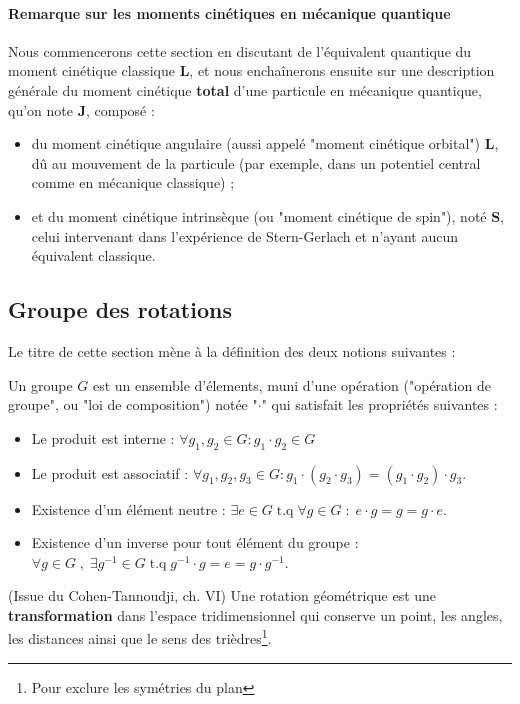 \documentclass[../notesdecours.tex]{subfiles}
\begin{document}
\paragraph{Remarque sur les moments cinétiques en mécanique quantique}
Nous commencerons cette section en discutant de l'équivalent quantique du moment cinétique classique $\mathcal{\mathbf{L}}$, et nous enchaînerons ensuite sur une description générale du moment cinétique \textbf{total} d'une particule en mécanique quantique, qu'on note $\mathbf{J}$, composé :
\begin{itemize}
    \item du moment cinétique angulaire (aussi appelé "moment cinétique orbital") $\mathbf{L}$, dû au mouvement de la particule (par exemple, dans un potentiel central comme en mécanique classique) ;
    \item et du moment cinétique intrinsèque (ou "moment cinétique de spin"), noté $\mathbf{S}$, celui intervenant dans l'expérience de Stern-Gerlach et n'ayant aucun équivalent classique.
\end{itemize}


\subsection{Groupe des rotations}

Le titre de cette section mène à la définition des deux notions suivantes :
\begin{definition}
    Un groupe $G$ est un ensemble d'élements, muni d'une opération ("opération de groupe", ou "loi de composition") notée "$\cdot$" qui satisfait les propriétés suivantes :
    \begin{itemize}
        \item Le produit est interne : $\forall g_1, g_2 \in G : g_1\cdot g_2 \in G$
        \item Le produit est associatif : $\forall g_1, g_2, g_3 \in G : g_1\cdot(g_2\cdot g_3) = (g_1\cdot g_2)\cdot g_3.$
        \item Existence d'un élément neutre : $\exists e\in G \; \text{t.q} \; \forall g \in G \; : \; e\cdot g = g = g\cdot e$.
        \item Existence d'un inverse pour tout élément du groupe : $\forall g \in G\; ,\; \exists g^{-1}\in G \; \text{t.q} \; g^{-1}\cdot g = e = g\cdot g^{-1}.$
    \end{itemize}
\end{definition}
\begin{definition}(Issue du Cohen-Tannoudji, ch. VI)
    Une rotation géométrique est une \textbf{transformation} dans l'espace tridimensionnel qui conserve un point, les angles, les distances ainsi que le sens des trièdres\footnote{Pour exclure les symétries du plan}.
\end{definition}
\end{document}
